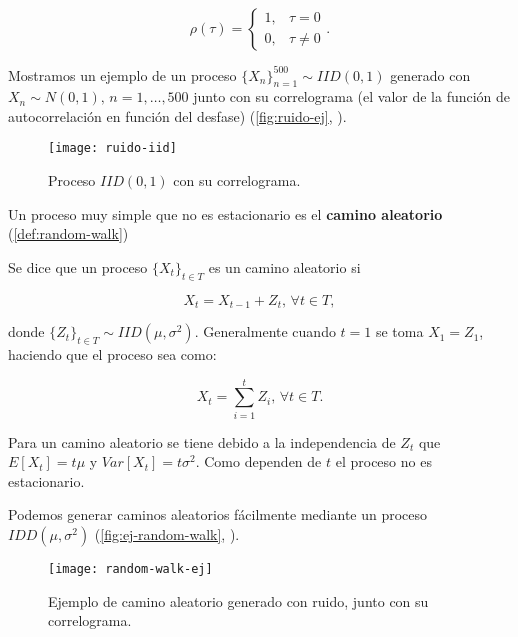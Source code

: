 \begin{equation}
  \rho(\tau) =
  \begin{cases}
    1, & \tau = 0 \\
    0, & \tau \neq 0
  \end{cases}.
  \label{eq:ruido-autocorrelacion}
\end{equation}

Mostramos un ejemplo de un proceso $\{X_n\}_{n = 1}^{500} \sim IID(0, 1)$ generado con $X_n \sim N(0, 1), \, n = 1, \ldots, 500$ junto con su correlograma (el valor de la función de autocorrelación en función del desfase) (\autoref{fig:ruido-ej}, \cite{chatfield2019analysis}).

\begin{figure}[htpb]
  \centering
  \texttt{[image: ruido-iid]}
  \caption{Proceso $IID(0, 1)$ con su correlograma.}
  \label{fig:ruido-ej}
\end{figure}

Un proceso muy simple que no es estacionario es el \textbf{camino aleatorio} (\autoref{def:random-walk})

\begin{definicion}
  Se dice que un proceso $\{X_t\}_{t \in T}$ es un camino aleatorio si

  $$X_t = X_{t - 1} + Z_t, \, \forall t \in T,$$

  donde $\{Z_t\}_{t \in T} \sim IID(\mu , \sigma^2)$. Generalmente cuando $t = 1$ se toma $X_1 = Z_1$, haciendo que el proceso sea como:

  $$X_t = \sum \limits^t_{i = 1} Z_i, \, \forall t \in T.$$
  \label{def:random-walk}
\end{definicion}

Para un camino aleatorio se tiene debido a la independencia de $Z_t$ que $E[X_t] = t \mu$ y $Var[X_t] = t \sigma^2$. Como dependen de $t$ el proceso no es estacionario.

Podemos generar caminos aleatorios fácilmente mediante un proceso $IDD(\mu, \sigma^2)$ (\autoref{fig:ej-random-walk}, \cite{chatfield2019analysis}).

\begin{figure}[htpb]
  \centering
  \texttt{[image: random-walk-ej]}
  \caption{Ejemplo de camino aleatorio generado con ruido, junto con su correlograma.}
  \label{fig:ej-random-walk}
\end{figure}

